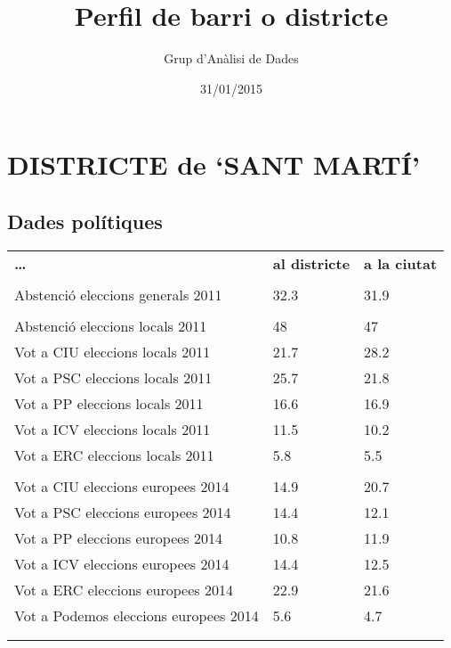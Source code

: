 \documentclass[]{article}
\title{Perfil de barri o districte}
\author{Grup d'Anàlisi de Dades}
\date{31/01/2015}
\begin{document}
\maketitle


\section{DISTRICTE de `SANT MARTÍ'}\label{districte-de-sant-marti}

\subsection{Dades polítiques}\label{dades-politiques}

\begin{longtable}[c]{@{}lll@{}}
\toprule\addlinespace
\textbf{\ldots{}} & \textbf{al districte} & \textbf{a la ciutat}
\\\addlinespace
\midrule\endhead
\\\addlinespace
Abstenció eleccions generals 2011 & 32.3 & 31.9
\\\addlinespace
\\\addlinespace
Abstenció eleccions locals 2011 & 48 & 47
\\\addlinespace
Vot a CIU eleccions locals 2011 & 21.7 & 28.2
\\\addlinespace
Vot a PSC eleccions locals 2011 & 25.7 & 21.8
\\\addlinespace
Vot a PP eleccions locals 2011 & 16.6 & 16.9
\\\addlinespace
Vot a ICV eleccions locals 2011 & 11.5 & 10.2
\\\addlinespace
Vot a ERC eleccions locals 2011 & 5.8 & 5.5
\\\addlinespace
\\\addlinespace
Vot a CIU eleccions europees 2014 & 14.9 & 20.7
\\\addlinespace
Vot a PSC eleccions europees 2014 & 14.4 & 12.1
\\\addlinespace
Vot a PP eleccions europees 2014 & 10.8 & 11.9
\\\addlinespace
Vot a ICV eleccions europees 2014 & 14.4 & 12.5
\\\addlinespace
Vot a ERC eleccions europees 2014 & 22.9 & 21.6
\\\addlinespace
Vot a Podemos eleccions europees 2014 & 5.6 & 4.7
\\\addlinespace
\\\addlinespace
\bottomrule
\end{longtable}
\end{document}
